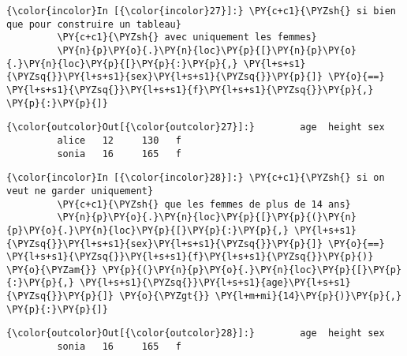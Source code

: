     \begin{Verbatim}[commandchars=\\\{\},frame=single,framerule=0.3mm,rulecolor=\color{cellframecolor}]
{\color{incolor}In [{\color{incolor}27}]:} \PY{c+c1}{\PYZsh{} si bien que pour construire un tableau}
         \PY{c+c1}{\PYZsh{} avec uniquement les femmes}
         \PY{n}{p}\PY{o}{.}\PY{n}{loc}\PY{p}{[}\PY{n}{p}\PY{o}{.}\PY{n}{loc}\PY{p}{[}\PY{p}{:}\PY{p}{,} \PY{l+s+s1}{\PYZsq{}}\PY{l+s+s1}{sex}\PY{l+s+s1}{\PYZsq{}}\PY{p}{]} \PY{o}{==} \PY{l+s+s1}{\PYZsq{}}\PY{l+s+s1}{f}\PY{l+s+s1}{\PYZsq{}}\PY{p}{,} \PY{p}{:}\PY{p}{]}
\end{Verbatim}


\begin{Verbatim}[commandchars=\\\{\},frame=single,framerule=0.3mm,rulecolor=\color{cellframecolor}]
{\color{outcolor}Out[{\color{outcolor}27}]:}        age  height sex
         alice   12     130   f
         sonia   16     165   f
\end{Verbatim}
            
    \begin{Verbatim}[commandchars=\\\{\},frame=single,framerule=0.3mm,rulecolor=\color{cellframecolor}]
{\color{incolor}In [{\color{incolor}28}]:} \PY{c+c1}{\PYZsh{} si on veut ne garder uniquement}
         \PY{c+c1}{\PYZsh{} que les femmes de plus de 14 ans}
         \PY{n}{p}\PY{o}{.}\PY{n}{loc}\PY{p}{[}\PY{p}{(}\PY{n}{p}\PY{o}{.}\PY{n}{loc}\PY{p}{[}\PY{p}{:}\PY{p}{,} \PY{l+s+s1}{\PYZsq{}}\PY{l+s+s1}{sex}\PY{l+s+s1}{\PYZsq{}}\PY{p}{]} \PY{o}{==} \PY{l+s+s1}{\PYZsq{}}\PY{l+s+s1}{f}\PY{l+s+s1}{\PYZsq{}}\PY{p}{)} \PY{o}{\PYZam{}} \PY{p}{(}\PY{n}{p}\PY{o}{.}\PY{n}{loc}\PY{p}{[}\PY{p}{:}\PY{p}{,} \PY{l+s+s1}{\PYZsq{}}\PY{l+s+s1}{age}\PY{l+s+s1}{\PYZsq{}}\PY{p}{]} \PY{o}{\PYZgt{}} \PY{l+m+mi}{14}\PY{p}{)}\PY{p}{,} \PY{p}{:}\PY{p}{]}
\end{Verbatim}


\begin{Verbatim}[commandchars=\\\{\},frame=single,framerule=0.3mm,rulecolor=\color{cellframecolor}]
{\color{outcolor}Out[{\color{outcolor}28}]:}        age  height sex
         sonia   16     165   f
\end{Verbatim}
            
